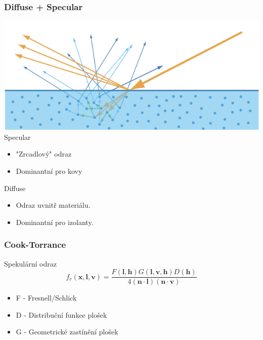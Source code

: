 \begin{frame}
    \frametitle{Diffuse + Specular}
    \includegraphics[width=\textwidth]{pics/physicallyBasedRendering/ds} \\
    Specular
    \begin{itemize}
        \item "Zrcadlový" odraz
        \item Dominantní pro kovy
    \end{itemize}
    Diffuse
    \begin{itemize}
        \item Odraz uvnitř materiálu.
        \item Dominantní pro izolanty.
    \end{itemize}
\end{frame}

\begin{frame}
    \frametitle{Cook-Torrance}
    Spekulární odraz
    \begin{equation*}
        f_r(\mathbf x, \mathbf l, \mathbf v) = \frac{F(\mathbf l, \mathbf h)G(\mathbf l, \mathbf v, \mathbf h)D(\mathbf h)}{4(\mathbf n \cdot \mathbf l)(\mathbf n \cdot \mathbf v)}
    \end{equation*}
    \begin{itemize}
        \item F - Fresnell/Schlick
        \item D - Distribuční funkce plošek
        \item G - Geometrické zastínění plošek
    \end{itemize}
\end{frame}

